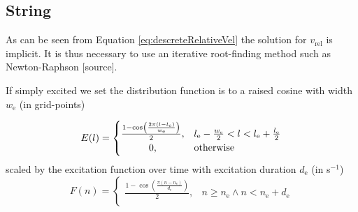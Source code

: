 \documentclass{article}
\begin{document}
\subsection{String}


As can be seen from Equation \eqref{eq:descreteRelativeVel} the solution for $v_\text{rel}$ is implicit. It is thus necessary to use an iterative root-finding method such as Newton-Raphson [source].

If simply excited we set the distribution function is to a raised cosine with width $w_\text{e}$ (in grid-points)

\begin{equation}\label{eq:discDist}
    E(l) = 
    \begin{cases}
        \hfil \frac{1 - \cos(\frac{2 \pi (l - l_\text{e})}{w_\text{e}})}{2}, & l_\text{e} -  \frac{w_\text{e}}{2} < l < l_\text{e} + \frac{l_\text{e}}{2} \\
        \hfil 0, &\text{otherwise}
    \end{cases}
\end{equation}
scaled by the excitation function over time with excitation duration $d_\text{e}$ (in s$^{-1}$)
\begin{equation}
    F(n) = 
    \begin{cases}
        \frac{1 - \cos(\frac{\pi (n - n_\text{e})}{d_\text{e}})}{2}, & n \geq n_\text{e} \wedge n < n_\text{e}+d_\text{e}\\
    \end{cases}
\end{equation}
\end{document}
